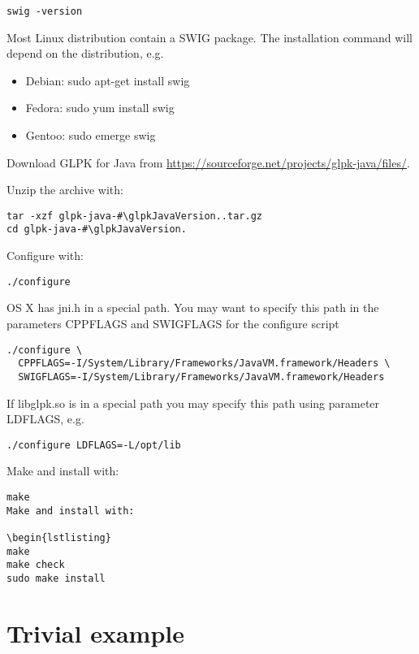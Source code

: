 \documentclass[a4paper,11pt]{report}
\newcommand{\glpkJavaVersion}{1.0.37}
\begin{document}
\begin{lstlisting}
swig -version
\end{lstlisting}

Most Linux distribution contain a SWIG package. The installation command will
depend on the distribution, e.g.

\begin{itemize}
\item Debian: sudo apt-get install swig
\item Fedora: sudo yum install swig
\item Gentoo: sudo emerge swig
\end{itemize}

Download GLPK for Java from \href{https://sourceforge.net/projects/glpk-java/files/}{https://sourceforge.net/projects/glpk-java/files/}.

Unzip the archive with:

\begin{lstlisting}
tar -xzf glpk-java-#\glpkJavaVersion..tar.gz
cd glpk-java-#\glpkJavaVersion.
\end{lstlisting}

Configure with:
\begin{lstlisting}
./configure
\end{lstlisting}

OS X has jni.h in a special path. You may want to specify this path in the
parameters CPPFLAGS and SWIGFLAGS for the configure script

\begin{lstlisting}
./configure \
  CPPFLAGS=-I/System/Library/Frameworks/JavaVM.framework/Headers \
  SWIGFLAGS=-I/System/Library/Frameworks/JavaVM.framework/Headers
\end{lstlisting}

If libglpk.so is in a special path you may specify this path using parameter
LDFLAGS, e.g.

\begin{lstlisting}
./configure LDFLAGS=-L/opt/lib
\end{lstlisting}

Make and install with:

\begin{lstlisting}
make
Make and install with:

\begin{lstlisting}
make
make check
sudo make install
\end{lstlisting}

\section{Trivial example}
\end{document}
